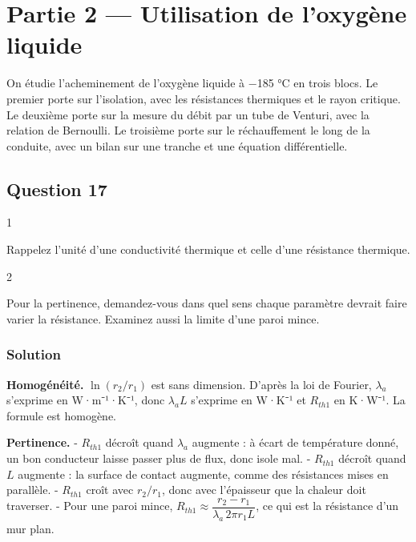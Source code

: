 \documentclass[11pt,a4paper]{article}
\begin{document}
\hypertarget{partie-2-utilisation-de-loxyguxe8ne-liquide}{%
\section{Partie 2 --- Utilisation de l'oxygène liquide}\label{partie-2-utilisation-de-loxyguxe8ne-liquide}}

On étudie l'acheminement de l'oxygène liquide à −185 °C en trois blocs. Le premier porte sur l'isolation, avec les résistances thermiques et le rayon critique. Le deuxième porte sur la mesure du débit par un tube de Venturi, avec la relation de Bernoulli. Le troisième porte sur le réchauffement le long de la conduite, avec un bilan sur une tranche et une équation différentielle.

\hypertarget{question-17}{%
\subsection{Question 17}\label{question-17}}

\begin{indication}{1}

Rappelez l'unité d'une conductivité thermique et celle d'une résistance thermique.

\end{indication}

\begin{indication}{2}

Pour la pertinence, demandez-vous dans quel sens chaque paramètre devrait faire varier la résistance. Examinez aussi la limite d'une paroi mince.

\end{indication}

\hypertarget{solution-16}{%
\subsubsection{Solution}\label{solution-16}}

\textbf{Homogénéité.} \(\ln(r_2/r_1)\) est sans dimension. D'après la loi de Fourier, \(\lambda_a\) s'exprime en W·m⁻¹·K⁻¹, donc \(\lambda_aL\) s'exprime en W·K⁻¹ et \(R_{th1}\) en K·W⁻¹. La formule est homogène.

\textbf{Pertinence.}
- \(R_{th1}\) décroît quand \(\lambda_a\) augmente : à écart de température donné, un bon conducteur laisse passer plus de flux, donc isole mal.
- \(R_{th1}\) décroît quand \(L\) augmente : la surface de contact augmente, comme des résistances mises en parallèle.
- \(R_{th1}\) croît avec \(r_2/r_1\), donc avec l'épaisseur que la chaleur doit traverser.
- Pour une paroi mince, \(R_{th1}\approx\dfrac{r_2-r_1}{\lambda_a\,2\pi r_1L}\), ce qui est la résistance d'un mur plan.
\end{document}
